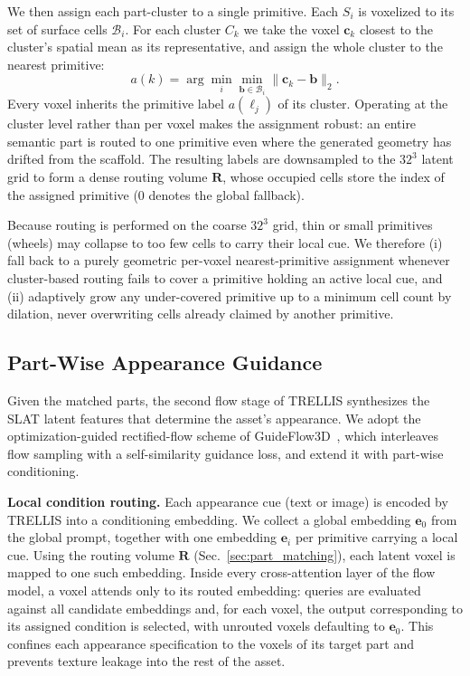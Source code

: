 We then assign each part-cluster to a single primitive. Each $S_i$ is voxelized to its set of surface cells $\mathcal{B}_i$. For each cluster $C_k$ we take the voxel $\mathbf{c}_k$ closest to the cluster's spatial mean as its representative, and assign the whole cluster to the nearest primitive:
\vspace{-2mm}
\begin{equation}
a(k) = \arg\min_{i} \min_{\mathbf{b}\in\mathcal{B}_i} \lVert \mathbf{c}_k - \mathbf{b}\rVert_2 .
\label{eq:cluster_assignment}
\end{equation}
Every voxel inherits the primitive label $a(\ell_j)$ of its cluster. Operating at the cluster level rather than per voxel makes the assignment robust: an entire semantic part is routed to one primitive even where the generated geometry has drifted from the scaffold. The resulting labels are downsampled to the $32^3$ latent grid to form a dense routing volume $\mathbf{R}$, whose occupied cells store the index of the assigned primitive ($0$ denotes the global fallback).

Because routing is performed on the coarse $32^3$ grid, thin or small primitives (\eg wheels) may collapse to too few cells to carry their local cue. We therefore (i) fall back to a purely geometric per-voxel nearest-primitive assignment whenever cluster-based routing fails to cover a primitive holding an active local cue, and (ii) adaptively grow any under-covered primitive up to a minimum cell count by dilation, never overwriting cells already claimed by another primitive.

\subsection{Part-Wise Appearance Guidance}
\label{sec:appearance_local_control}
Given the matched parts, the second flow stage of TRELLIS synthesizes the SLAT latent features that determine the asset's appearance. We adopt the optimization-guided rectified-flow scheme of GuideFlow3D~\cite{sayandsarkar_2025_guideflow3d}, which interleaves flow sampling with a self-similarity guidance loss, and extend it with part-wise conditioning.

\noindent\textbf{Local condition routing.}
Each appearance cue (text or image) is encoded by TRELLIS into a conditioning embedding. We collect a global embedding $\mathbf{e}_0$ from the global prompt, together with one embedding $\mathbf{e}_i$ per primitive carrying a local cue. Using the routing volume $\mathbf{R}$ (Sec.~\ref{sec:part_matching}), each latent voxel is mapped to one such embedding. Inside every cross-attention layer of the flow model, a voxel attends only to its routed embedding: queries are evaluated against all candidate embeddings and, for each voxel, the output corresponding to its assigned condition is selected, with unrouted voxels defaulting to $\mathbf{e}_0$. This confines each appearance specification to the voxels of its target part and prevents texture leakage into the rest of the asset.

